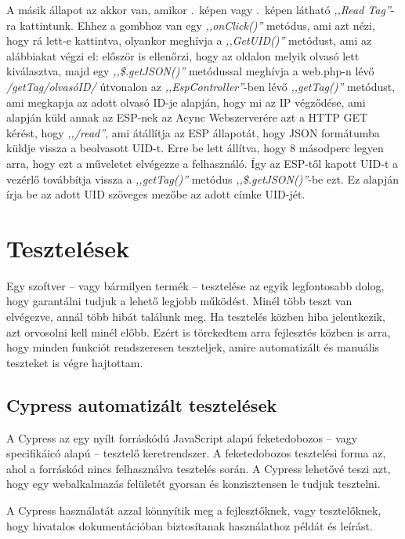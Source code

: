 \documentclass[
]{thesis-ekf}
\theoremstyle{definition}
\theoremstyle{remark}
\begin{document}
	A másik állapot az akkor van, amikor .~képen vagy .~képen látható \emph{,,Read Tag''}-ra kattintunk. Ehhez a gombhoz van egy \emph{,,onClick()''} metódus, ami azt nézi, hogy rá lett-e kattintva, olyankor meghívja a \emph{,,GetUID()''} metódust, ami az alábbiakat végzi el: először is ellenőrzi, hogy az oldalon melyik olvasó lett kiválasztva, majd egy \emph{,,\$.getJSON()''} metódussal meghívja a web.php-n lévő \emph{/getTag/olvasóID/} útvonalon az \emph{,,EspController''}-ben lévő \emph{,,getTag()''} metódust, ami megkapja az adott olvasó ID-je alapján, hogy mi az IP végződése, ami alapján küld annak az ESP-nek az Acync Webszerverére azt a HTTP GET kérést, hogy \emph{,,/read''}, ami átállítja az ESP állapotát, hogy JSON formátumba küldje vissza a beolvasott UID-t. Erre be lett állítva, hogy 8 másodperc legyen arra, hogy ezt a műveletet elvégezze a felhasználó. Így az ESP-től kapott UID-t a vezérlő továbbítja vissza a \emph{,,getTag()''} metódus \emph{,,\$.getJSON()''}-be ezt. Ez alapján írja be az adott UID szöveges mezőbe az adott címke UID-jét.
	
	
	\chapter{Tesztelések}
	Egy szoftver -- vagy bármilyen termék -- tesztelése az egyik legfontosabb dolog, hogy garantálni tudjuk a lehető legjobb működést. Minél több teszt van elvégezve, annál több hibát találunk meg. Ha tesztelés közben hiba jelentkezik, azt orvosolni kell minél előbb. Ezért is törekedtem arra fejlesztés közben is arra, hogy minden funkciót rendszeresen teszteljek, amire automatizált és manuális teszteket is végre hajtottam.
	
	\section{Cypress automatizált tesztelések}
	
	A Cypress az egy nyílt forráskódú JavaScript alapú feketedobozos -- vagy specifikáicó alapú -- tesztelő keretrendszer. A feketedobozos tesztelési forma az, ahol a forráskód nincs felhasználva tesztelés során. A Cypress lehetővé teszi azt, hogy egy webalkalmazás felületét gyorsan és konzisztensen le tudjuk tesztelni. 
	
	A Cypress használatát azzal könnyítik meg a fejlesztőknek, vagy tesztelőknek, hogy hivatalos dokumentációban biztosítanak használathoz példát és leírást.\cite{cypress-docs}
	
\end{document}

